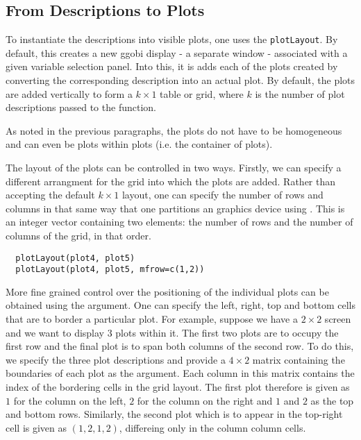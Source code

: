 \documentclass{article}
\def\SFunction#1{{\texttt{\red #1}}}
\begin{document}
\subsection{From Descriptions to Plots}
To instantiate the descriptions into visible plots, one uses the
\SFunction{plotLayout}.  By default, this creates a new ggobi display
- a separate window - associated with a given variable selection
panel. Into this, it is adds each of the plots created by converting
the corresponding description into an actual plot.  By default, the
plots are added vertically to form a $k \times 1$ table or grid, where
$k$ is the number of plot descriptions passed to the function.

As noted in the previous paragraphs, the plots do not have to be
homogeneous and can even be plots within plots (i.e. the container of
plots).


The layout of the plots can be controlled in two ways.  Firstly, we
can specify a different arrangment for the grid into which the plots
are added.  Rather than accepting the default $k \times 1$ layout, one
can specify the number of rows and columns in that same way that one
partitions an \R{} graphics device using .  This is an
integer vector containing two elements: the number of rows and the
number of columns of the grid, in that order.

\begin{verbatim}
  plotLayout(plot4, plot5)
  plotLayout(plot4, plot5, mfrow=c(1,2))
\end{verbatim}


More fine grained control over the positioning of the individual plots
can be obtained using the  argument. One can specify the
left, right, top and bottom cells that are to border a particular
plot.  For example, suppose we have a $2 \times 2$ screen and we want
to display 3 plots within it.  The first two plots are to occupy the
first row and the final plot is to span both columns of the second
row. To do this, we specify the three plot descriptions and provide a
$4 \times 2$ matrix containing the boundaries of each plot as the
 argument.  Each column in this matrix contains the index
of the bordering cells in the grid layout. The first plot therefore is
given as $1$ for the column on the left, $2$ for the column on the
right and $1$ and $2$ as the top and bottom rows.  Similarly, the
second plot which is to appear in the top-right cell is given as $(1,
2, 1, 2)$, differeing only in the column column cells.
\end{document}
